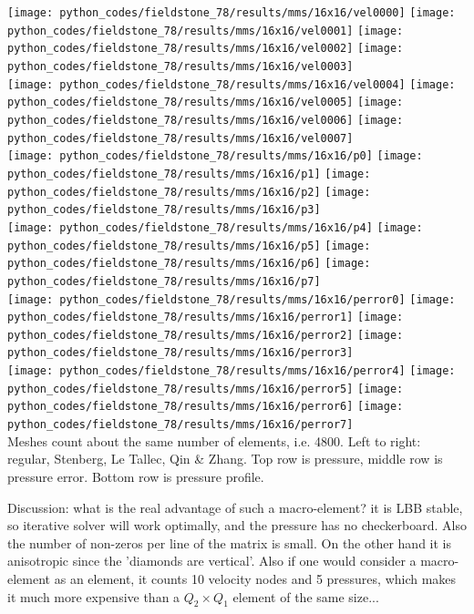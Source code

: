 \begin{center}
\texttt{[image: python\_codes/fieldstone\_78/results/mms/16x16/vel0000]}
\texttt{[image: python\_codes/fieldstone\_78/results/mms/16x16/vel0001]}
\texttt{[image: python\_codes/fieldstone\_78/results/mms/16x16/vel0002]}
\texttt{[image: python\_codes/fieldstone\_78/results/mms/16x16/vel0003]}\\
\texttt{[image: python\_codes/fieldstone\_78/results/mms/16x16/vel0004]}
\texttt{[image: python\_codes/fieldstone\_78/results/mms/16x16/vel0005]}
\texttt{[image: python\_codes/fieldstone\_78/results/mms/16x16/vel0006]}
\texttt{[image: python\_codes/fieldstone\_78/results/mms/16x16/vel0007]}\\
\texttt{[image: python\_codes/fieldstone\_78/results/mms/16x16/p0]}
\texttt{[image: python\_codes/fieldstone\_78/results/mms/16x16/p1]}
\texttt{[image: python\_codes/fieldstone\_78/results/mms/16x16/p2]}
\texttt{[image: python\_codes/fieldstone\_78/results/mms/16x16/p3]}\\
\texttt{[image: python\_codes/fieldstone\_78/results/mms/16x16/p4]}
\texttt{[image: python\_codes/fieldstone\_78/results/mms/16x16/p5]}
\texttt{[image: python\_codes/fieldstone\_78/results/mms/16x16/p6]}
\texttt{[image: python\_codes/fieldstone\_78/results/mms/16x16/p7]}\\
\texttt{[image: python\_codes/fieldstone\_78/results/mms/16x16/perror0]}
\texttt{[image: python\_codes/fieldstone\_78/results/mms/16x16/perror1]}
\texttt{[image: python\_codes/fieldstone\_78/results/mms/16x16/perror2]}
\texttt{[image: python\_codes/fieldstone\_78/results/mms/16x16/perror3]}\\
\texttt{[image: python\_codes/fieldstone\_78/results/mms/16x16/perror4]}
\texttt{[image: python\_codes/fieldstone\_78/results/mms/16x16/perror5]}
\texttt{[image: python\_codes/fieldstone\_78/results/mms/16x16/perror6]}
\texttt{[image: python\_codes/fieldstone\_78/results/mms/16x16/perror7]}\\
{\captionfont Meshes count about the same number of elements, i.e. 4800. 
Left to right: regular, Stenberg, Le Tallec, Qin \& Zhang. Top row is pressure, 
middle row is pressure error. Bottom row is pressure profile.} 
\end{center}



Discussion: what is the real advantage of such a macro-element? it is LBB stable, so 
iterative solver will work optimally, and the pressure has no checkerboard. 
Also the number of non-zeros per line of the matrix is small.  
On the other hand it is anisotropic since the 'diamonds are vertical'. 
Also if one would consider a macro-element as an element, it counts 10 velocity nodes and 5 pressures, 
which makes it much more expensive than a $Q_2\times Q_1$ element of the same size...







